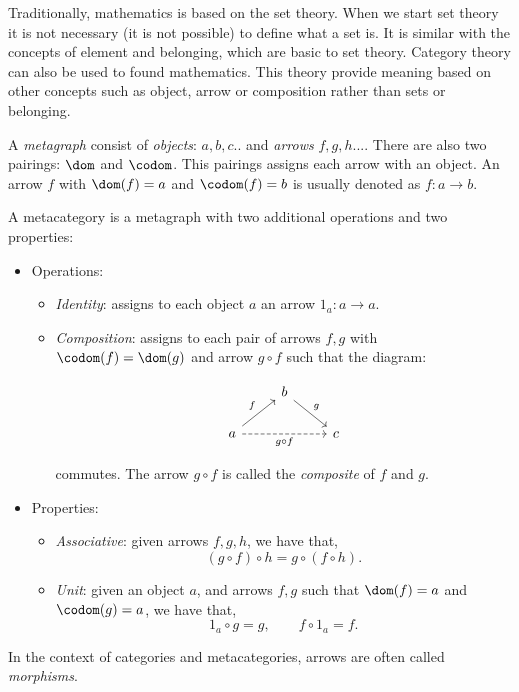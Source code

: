 Traditionally, mathematics is based on the set theory. When we start set theory it is not necessary (it is not possible) to define what a set is. It is similar with the concepts of element and belonging, which are basic to set theory. Category theory can also be used to found mathematics. This theory provide meaning based on other concepts such as object, arrow or composition rather than sets or belonging. \\

\begin{definition} \label{def:metagraph}
  A \emph{metagraph} consist of \emph{objects}: $a,b,c..$ and \emph{arrows} $f,g,h...$. There are also two pairings: $\dom$ and $\codom$. This pairings assigns each arrow with an object. An arrow $f$ with $\dom(f)=a$ and $\codom(f)=b$ is usually denoted as $f:a\to b$.\\
\end{definition}

\begin{definition}
  A metacategory  is a metagraph with two additional operations and two properties:
  \begin{itemize}
  \item Operations:
    \begin{itemize}
      
    \item \emph{Identity}: assigns to each object $a$ an arrow $1_a:a\to a$. 
    \item \emph{Composition}: assigns to each pair of arrows $f,g$ with $\codom(f)=\dom(g)$ and arrow $g\circ f$ such that the diagram:

      \[
        \begin{tikzcd}
          & b \arrow[rd, "g"]& \\
          a\arrow[ru, "f"] \arrow[rr, "g\circ f",swap, dashed] && c
        \end{tikzcd}
      \]

      commutes. The arrow $g\circ f$ is called the \emph{composite} of $f$  and $g$.
    \end{itemize}

  \item Properties:
    \begin{itemize}
    \item \emph{Associative}: given arrows $f,g,h$, we have that,
      $$(g\circ f) \circ h = g \circ (f \circ h).$$
    \item \emph{Unit}: given an object $a$, and arrows $f,g$ such that $\dom (f)= a$ and $\codom (g) = a$, we have that,
      $$1_a \circ g = g, \qquad f \circ 1_a = f.$$
    \end{itemize}
  \end{itemize}
  In the context of categories and metacategories, arrows are often called \emph{morphisms}.
\end{definition}

